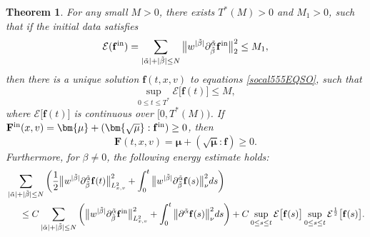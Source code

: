 \documentclass[reqno]{amsart}
\numberwithin{equation}{section}
\newtheorem{theorem}{Theorem}[section]
\numberwithin{equation}{section}
\begin{document}
	
	\begin{theorem}\label{soceadTm4}
		For any small $M > 0$, there exists $T^*(M) > 0$ and $M_1 > 0$, such that if the initial data satisfies 
		\[
		\mathcal{E}(\mathbf{f}^{\rm{in}}) = \sum_{|\tilde{\alpha}| + |\tilde{\beta}| \leq N} \big\| w^{|\tilde{\beta}|} \partial^{\tilde{\alpha}}_{\tilde{\beta}} \mathbf{f}^{\rm{in}} \big\|_2^2 \leq M_1,
		\]
		then there is a unique solution $\mathbf{f}(t, x, v)$ to equations \eqref{socal555EQSO}, such that
		\[
		\sup_{0 \leq t \leq T^*} \mathcal{E}\big[\mathbf{f}(t)\big] \leq M,
		\]
		where $\mathcal{E}\big[\mathbf{f}(t)\big]$ is continuous over $[0, T^*(M))$. If $\mathbf{F}^{\rm{in}}(x, v) = \bm{\mu} + (\bm{\sqrt{\mu}} : \mathbf{f}^{\rm{in}}) \geq 0$, then
		\[
		\mathbf{F}(t, x, v) = \bm{\mu} + (\bm{\sqrt{\mu}} : \mathbf{f}) \geq 0.
		\]
		Furthermore, for $\beta \neq 0$, the following energy estimate holds:
		\begin{align}
			&\sum_{|\tilde{\alpha}| + |\tilde{\beta}| \leq N} \left(\frac{1}{2} \big\|w^{|\tilde{\beta}|}\partial_{\tilde{\beta}}^{\tilde{\alpha}} \mathbf{f}(t)\big\|^2_{L^{2}_{x,v}} + \int_0^t  \big\|w^{|\tilde{\beta}|}\partial_{\tilde{\beta}}^{\tilde{\alpha}} \mathbf{f}(s)\big\|^2_{\nu} ds \right) \notag\\
			&\hspace{0.5cm}\leq C \sum_{|\tilde{\alpha}| + |\tilde{\beta}| \leq N} \left(\big\|w^{|\tilde{\beta}|}\partial_{\tilde{\beta}}^{\tilde{\alpha}} \mathbf{f}^{\rm{in}}\big\|^2_{L^{2}_{x,v}} +  \int_0^t \big\| \partial^{\tilde{\alpha}} \mathbf{f}(s) \big\|^2_{\nu} ds \right)
			 + C \sup_{0 \leq s \leq t} \mathcal{E}\big[\mathbf{f}(s)\big] \sup_{0 \leq s \leq t} \mathcal{E}^{\frac{1}{2}}\big[\mathbf{f}(s)\big].\label{socad7878}
		\end{align}
	\end{theorem}
\end{document}
